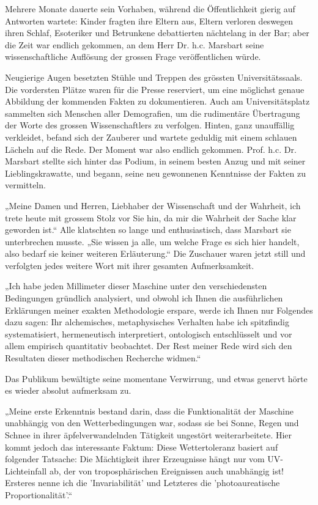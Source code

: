 Mehrere Monate dauerte sein Vorhaben, während die
Öffentlichkeit gierig auf Antworten wartete: Kinder fragten
ihre Eltern aus, Eltern verloren deswegen ihren Schlaf,
Esoteriker und Betrunkene debattierten nächtelang in der Bar;
aber die Zeit war endlich gekommen, an dem Herr Dr. h.c.
Marsbart seine wissenschaftliche Auflösung der grossen Frage
veröffentlichen würde.

Neugierige Augen besetzten Stühle und Treppen des grössten
Universitätssaals. Die vordersten Plätze waren für die Presse
reserviert, um eine möglichst genaue Abbildung der kommenden
Fakten zu dokumentieren. Auch am Universitätsplatz sammelten
sich Menschen aller Demografien, um die rudimentäre Übertragung
der Worte des grossen Wissenschaftlers zu verfolgen. Hinten,
ganz unauffällig verkleidet, befand sich der Zauberer und
wartete geduldig mit einem schlauen Lächeln auf die Rede. Der
Moment war also endlich gekommen. Prof. h.c. Dr. Marsbart
stellte sich hinter das Podium, in seinem besten Anzug und mit
seiner Lieblingskrawatte, und begann, seine neu gewonnenen
Kenntnisse der Fakten zu vermitteln.

„Meine Damen und Herren, Liebhaber der Wissenschaft und der
Wahrheit, ich trete heute mit grossem Stolz vor Sie hin, da mir
die Wahrheit der Sache klar geworden ist.“ Alle klatschten so
lange und enthusiastisch, dass Marsbart sie unterbrechen
musste. „Sie wissen ja alle, um welche Frage es sich hier
handelt, also bedarf sie keiner weiteren Erläuterung.“ Die
Zuschauer waren jetzt still und verfolgten jedes weitere Wort
mit ihrer gesamten Aufmerksamkeit.

„Ich habe jeden Millimeter dieser Maschine unter den
verschiedensten Bedingungen gründlich analysiert, und obwohl
ich Ihnen die ausführlichen Erklärungen meiner exakten
Methodologie erspare, werde ich Ihnen nur Folgendes dazu sagen:
Ihr alchemisches, metaphysisches Verhalten habe ich spitzfindig
systematisiert, hermeneutisch interpretiert, ontologisch
entschlüsselt und vor allem empirisch quantitativ beobachtet.
Der Rest meiner Rede wird sich den Resultaten dieser
methodischen Recherche widmen.“

Das Publikum bewältigte seine momentane Verwirrung, und etwas
genervt hörte es wieder absolut aufmerksam zu.

„Meine erste Erkenntnis bestand darin, dass die Funktionalität
der Maschine unabhängig von den Wetterbedingungen war, sodass
sie bei Sonne, Regen und Schnee in ihrer äpfelverwandelnden
Tätigkeit ungestört weiterarbeitete. Hier kommt jedoch das
interessante Faktum: Diese Wettertoleranz basiert auf folgender
Tatsache: Die Mächtigkeit ihrer Erzeugnisse hängt nur vom
UV-Lichteinfall ab, der von troposphärischen Ereignissen auch
unabhängig ist! Ersteres nenne ich die 'Invariabilität' und
Letzteres die 'photoaureatische Proportionalität'.“

